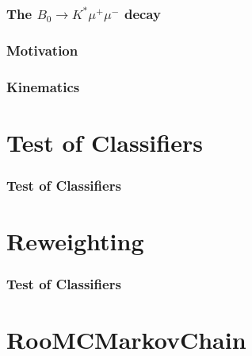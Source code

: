 \documentclass{beamer}
\begin{document}
\begin{frame}
  \frametitle{The $B_0 \rightarrow K^* \mu^+ \mu^-$ decay}

\end{frame}

\begin{frame}
  \frametitle{Motivation}

\end{frame}

\begin{frame}
  \frametitle{Kinematics}

\end{frame}


\section{Test of Classifiers}

\begin{frame}
  \frametitle{Test of Classifiers}

\end{frame}



\section{Reweighting}

\begin{frame}
  \frametitle{Test of Classifiers}

\end{frame}



\section{RooMCMarkovChain}

\end{document}
